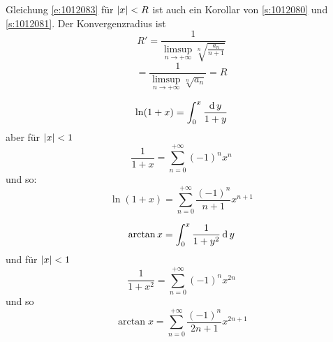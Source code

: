 \begin{Bew}
  Gleichung \ref{e:1012083} für $\mathopen| x \mathclose|<R$ ist auch ein Korollar von \ref{s:1012080} und \ref{s:1012081}. Der Konvergenzradius ist
  \[R'=\frac{1}{\limsup_{n\rightarrow+\infty}\sqrt[n]{\frac{a_n}{n+1}}}\]
  \[=\frac{1}{\limsup_{n\rightarrow+\infty}\sqrt[n]{a_n}}=R\]
\end{Bew}
\begin{Bsp}
  \[\ln(1+x)=\int_0^x\frac{\operatorname{d} y}{1+y}\]
  aber für $\mathopen| x \mathclose|<1$
  \[\frac{1}{1+x}=\sum_{n=0}^{+\infty}(-1)^nx^n\]
  und so:
  \[\ln(1+x)=\sum^{+\infty}_{n=0}\frac{(-1)^n}{n+1}x^{n+1}\]
\end{Bsp}
\begin{Bsp}
  \[\arctan x=\int_0^x\frac{1}{1+y^2}\operatorname{d} y\]
  und für $\mathopen| x \mathclose|<1$
  \[\frac{1}{1+x^2}=\sum_{n=0}^{+\infty}(-1)^nx^{2n}\]
  und so
  \[\arctan x=\sum^{+\infty}_{n=0}\frac{(-1)^n}{2n+1}x^{2n+1}\]
\end{Bsp}
